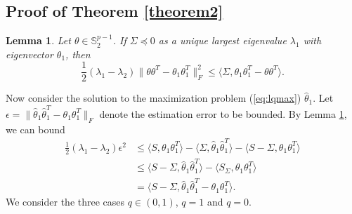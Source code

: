\documentclass[11pt]{article}
\newtheorem{lemma}[theorem]{Lemma}
\begin{document}
\subsection{Proof of Theorem \ref{theorem2}}
\begin{lemma}\label{lemma321}
Let $\theta\in \mathbb{S}^{p-1}_2$. If $\Sigma \preceq 0$ as a unique largest eigenvalue $\lambda_1$ with eigenvector $\theta_1$, then 
\begin{equation*}
\frac{1}{2}(\lambda_1 - \lambda_2)\|\theta\theta^T - \theta_1\theta_1^T\|_F^2 \le \langle \Sigma, \theta_1\theta_1^T - \theta\theta^T\rangle. 
\end{equation*}
\end{lemma}
Now consider the solution to the maximization problem (\ref{eq:lqmax}) $\hat\theta_1$. Let $\epsilon = \|\hat\theta_1\hat\theta_1^T - \theta_1\theta_1^T\|_F$ denote the estimation error to be bounded. By Lemma \ref{lemma321}, we can bound
\begin{align}
\frac{1}{2}(\lambda_1 - \lambda_2)\epsilon^2 &\le \langle S, \theta_1\theta_1^T\rangle - \langle \Sigma, \hat\theta_1\hat\theta_1^T\rangle - \langle S - \Sigma, \theta_1\theta_1^T\rangle \nonumber\\
&\le \langle S-\Sigma, \hat\theta_1\hat\theta_1^T\rangle - \langle S_\Sigma, \theta_1\theta_1^T\rangle \nonumber\\
&= \langle S-\Sigma , \hat\theta_1\hat\theta_1^T - \theta_1\theta_1^T\rangle. \label{eq18}
\end{align}
We consider the three cases $q\in (0,1)$, $q=1$ and $q=0$.
\end{document}
